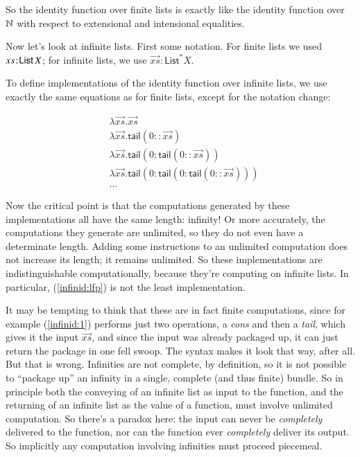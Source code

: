 \documentclass{article}
\begin{document}
So the identity function over finite lists is exactly like the
identity function over \(\mathbb{N}\) with respect to extensional and
intensional equalities.

Now let's look at infinite lists. First some notation. For finite
lists we used \(xs\hspace{1pt}\mathpunct{:}\hspace{-1pt}\textsf{List}\,X\); for infinite lists, we use
\(\overrightarrow{xs}:\textsf{List}^* X\).

To define implementations of the identity function over infinite
lists, we use exactly the same equations as for finite lists, except
for the notation change:

\begin{align}
  & \lambda \overrightarrow{xs}.\overrightarrow{xs} \label{infinid:lfp} \\
  & \lambda \overrightarrow{xs}.\textsf{tail}(0::\overrightarrow{xs})  \label{infinid:1}\\
  & \lambda \overrightarrow{xs}.\textsf{tail}(0:\textsf{tail}(0::\overrightarrow{xs}))  \label{infinid:2}\\
  & \lambda \overrightarrow{xs}.\textsf{tail}(0:\textsf{tail}(0:\textsf{tail}(0::\overrightarrow{xs}))) \label{infinid:3} \\
  & ... \nonumber
\end{align}

Now the critical point is that the computations generated by these
implementations all have the same length: infinity! Or more
accurately, the computations they generate are unlimited, so they do
not even have a determinate length. Adding some instructions to an
unlimited computation does not increase its length; it remains
unlimited. So these implementations are indistinguishable
computationally, because they're computing on infinite lists. In
particular, (\ref{infinid:lfp}) is not the least implementation.

It may be tempting to think that these are in fact finite
computations, since for example (\ref{infinid:1}) performs just two
operations, a \textit{cons} and then a \textit{tail}, which gives it
the input \(\overrightarrow{xs}\), and since the input was already
packaged up, it can just return the package in one fell swoop. The
syntax makes it look that way, after all. But that is wrong.
Infinities are not complete, by definition, so it is not possible to
``package up'' an infinity in a single, complete (and thus finite)
bundle. So in principle both the conveying of an infinite list as
input to the function, and the returning of an infinite list as the
value of a function, must involve unlimited computation. So there's a
paradox here: the input can never be \textit{completely} delivered to
the function, nor can the function ever \textit{completely} deliver
its output. So implicitly any computation involving infinities must
proceed piecemeal.
\end{document}
